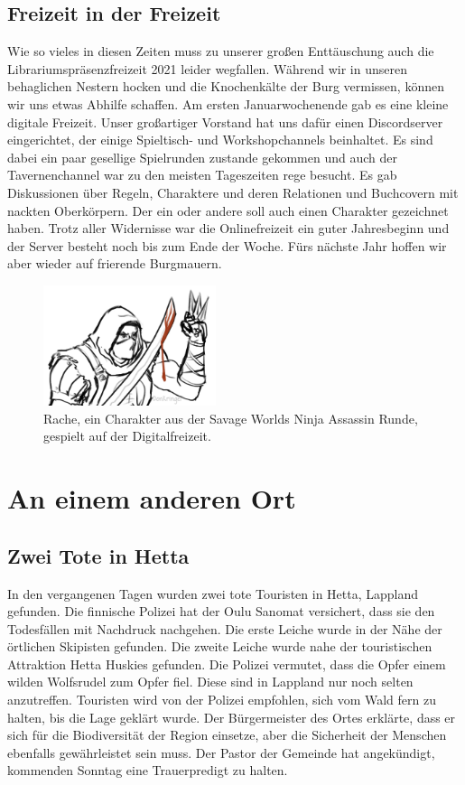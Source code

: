 \documentclass[final]{multiversum}
\begin{document}
\subsection{Freizeit in der Freizeit}
Wie so vieles in diesen Zeiten muss zu unserer großen Enttäuschung auch die Librariumspräsenzfreizeit 2021 leider wegfallen.
Während wir in unseren behaglichen Nestern hocken und die Knochenkälte der Burg vermissen, können wir uns etwas Abhilfe schaffen.
Am ersten Januarwochenende gab es eine kleine digitale Freizeit.
Unser großartiger Vorstand hat uns dafür einen Discordserver eingerichtet, der einige Spieltisch- und Workshopchannels beinhaltet.
Es sind dabei ein paar gesellige Spielrunden zustande gekommen und auch der Tavernenchannel war zu den meisten Tageszeiten rege besucht.
Es gab Diskussionen über Regeln, Charaktere und deren Relationen und Buchcovern mit nackten Oberkörpern.
Der ein oder andere soll auch einen Charakter gezeichnet haben.
Trotz aller Widernisse war die Onlinefreizeit ein guter Jahresbeginn und der Server besteht noch bis zum Ende der Woche.
Fürs nächste Jahr hoffen wir aber wieder auf frierende Burgmauern.

\begin{figure}[h]
  \includegraphics[width=0.45\textwidth]{src/img/ninja_assassin_rache_for_multiversum.jpg}\\
  Rache, ein Charakter aus der Savage Worlds Ninja Assassin Runde, gespielt auf der Digitalfreizeit.
\end{figure}

\section{An einem anderen Ort}

\subsection{Zwei Tote in Hetta}
In den vergangenen Tagen wurden zwei tote Touristen in Hetta, Lappland gefunden. 
Die finnische Polizei hat der Oulu Sanomat versichert, dass sie den Todesfällen mit Nachdruck nachgehen. 
Die erste Leiche wurde in der Nähe der örtlichen Skipisten gefunden. 
Die zweite Leiche wurde nahe der touristischen Attraktion Hetta Huskies gefunden. 
Die Polizei vermutet, dass die Opfer einem wilden Wolfsrudel zum Opfer fiel. 
Diese sind in Lappland nur noch selten anzutreffen. 
Touristen wird von der Polizei empfohlen, sich vom Wald fern zu halten, bis die Lage geklärt wurde. 
Der Bürgermeister des Ortes erklärte, dass er sich für die Biodiversität der Region einsetze, aber die Sicherheit der Menschen ebenfalls gewährleistet sein muss. 
Der Pastor der Gemeinde hat angekündigt, kommenden Sonntag eine Trauerpredigt zu halten.
\end{document}
